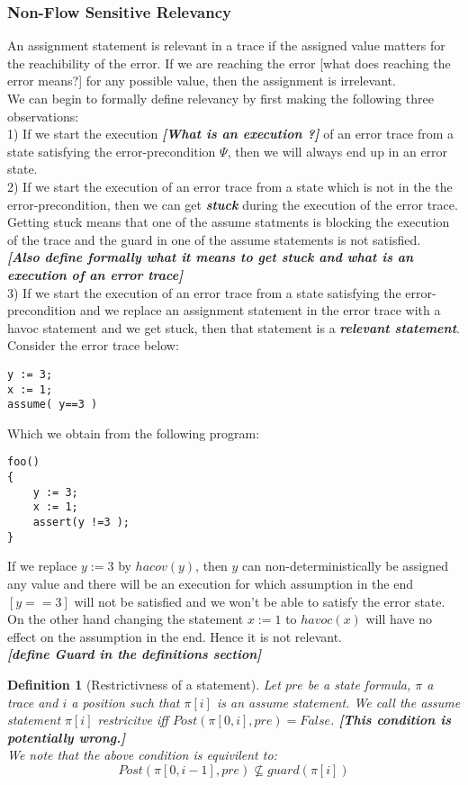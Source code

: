 \documentclass{article}
\newtheorem{mydef}{Definition}
\begin{document}
\subsubsection{Non-Flow Sensitive Relevancy}
An assignment statement is relevant in a trace if the assigned value matters for the reachibility of the error. If we are reaching the error [what does reaching the error means?] for any possible value, then the assignment is irrelevant.\\
We can begin to formally define relevancy by first making the following three observations:\\
1) If we start the execution \textbf{\textit{[What is an execution ?]}} of an error trace from a state satisfying the error-precondition $\Psi$, then we will always end up in an error state. \\
2) If we start the execution of an error trace from a state which is not in the the error-precondition, then we can get \textit{\textbf{stuck}} during the execution of the error trace. Getting stuck means that one of the assume statments is blocking the execution of the trace and the guard in one of the assume statements is not satisfied. \\
\textbf{\textit{[Also define formally what it means to get stuck and what is an execution of an error trace]}}\\
3) If we start the execution of an error trace from a state satisfying the error-precondition and we replace an assignment statement in the error trace with a havoc statement and we get stuck, then that statement is a \textit{\textbf{relevant statement}}.\\
Consider the error trace below:
\begin{lstlisting}
y := 3;
x := 1;
assume( y==3 )
\end{lstlisting}
Which we obtain from the following program:
\begin{lstlisting}
foo()
{
	y := 3;
	x := 1;
	assert(y !=3 );
}
\end{lstlisting}
If we replace $y:=3$ by $hacov(y)$, then $y$ can non-deterministically be assigned any value and there will be an execution for which assumption in the end $[y==3]$ will not be satisfied and we won't be able to satisfy the error state.\\
On the other hand changing the statement $x := 1$ to $havoc(x)$ will have no effect on the assumption in the end. Hence it is not relevant.\\
\textit{\textbf{[define Guard in the definitions section]}}
\begin{mydef}[Restrictivness of a statement]
Let $pre$ be a state formula, $\pi$ a trace and $i$ a position such that $\pi[i]$ is an assume statement. We call the assume statement $\pi[i]$ \emph{restricitve} iff $Post(\pi[0,i], pre) = False$. \textit{\textbf{[This condition is potentially wrong.]}}
\\We note that the above condition is equivilent to:
$$Post(\pi[0,i-1], pre) \not \subseteq guard(\pi[i])$$
\end{mydef}
\end{document}
